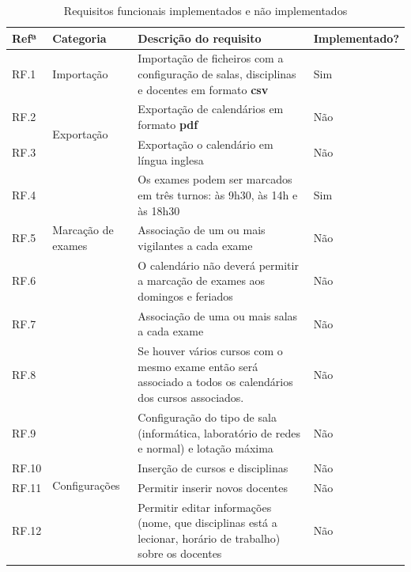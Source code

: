 \documentclass[12pt, twoside]{report}
\begin{document}
		
	\def\arraystretch{1.5}
	\begin{center}
		\label{requisitiosfuncionaisrevisao}
		\begin{longtable}{|m{1cm}|m{2.2cm}|m{9cm}|m{3cm}|}
			\caption{Requisitos funcionais implementados e não implementados}\\
			
			\hline			
			\textbf{Refª }	& \textbf{Categoria}&\textbf{Descrição do requisito} & \textbf{Implementado?} \\
			\hline
			
			RF.1 &Importação& Importação de ficheiros com a configuração de salas, disciplinas e docentes em formato \textbf{csv} & Sim \\
			\hline
			
			RF.2 &\multirow{2}{2cm}{Exportação}& Exportação de calendários em formato \textbf{pdf} & Não \\
			
			RF.3 && Exportação o calendário em língua inglesa & Não \\
			\hline
			
			RF.4 &\multirow{3}{2cm}{Marcação de exames}& Os exames podem ser marcados em três turnos: às 9h30, às 14h e às 18h30 & Sim \\
			
			RF.5 && Associação de um ou mais vigilantes a cada exame & Não \\
			
			RF.6 && O calendário não deverá permitir a marcação de exames aos domingos e feriados & Não \\
			
			RF.7 &&	Associação de uma ou mais salas a cada exame & Não\\
			
			RF.8 && Se houver vários cursos com o mesmo exame então será associado a todos os calendários dos cursos associados. & Não\\
			\hline
			
			RF.9 &\multirow{7}{2cm}{Configurações}& Configuração do tipo de sala (informática, laboratório de redes e normal) e lotação máxima & Não \\
			
			RF.10 & & Inserção de cursos e disciplinas & Não\\
			
			RF.11 && Permitir inserir novos docentes & Não\\
			
			RF.12 && Permitir editar informações (nome, que disciplinas está a lecionar, horário de trabalho) sobre os docentes & Não\\
			

\end{longtable}
\end{center}
\end{document}
